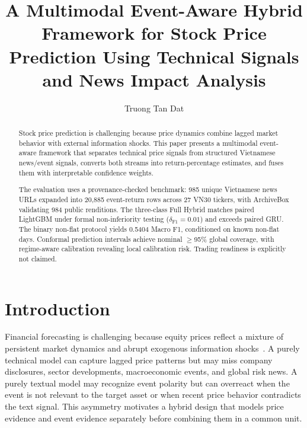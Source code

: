 \documentclass[runningheads]{llncs}
\title{A Multimodal Event-Aware Hybrid Framework for Stock Price Prediction Using Technical Signals and News Impact Analysis}
\author{Truong Tan Dat}
\institute{University of Information Technology, Vietnam National University Ho Chi Minh City\\ \email{datttruong.uit@gmail.com}}
\begin{document}
\maketitle

\begin{abstract}
Stock price prediction is challenging because price dynamics combine lagged market behavior with external information shocks. This paper presents a multimodal event-aware framework that separates technical price signals from structured Vietnamese news/event signals, converts both streams into return-percentage estimates, and fuses them with interpretable confidence weights.

The evaluation uses a provenance-checked benchmark: 985 unique Vietnamese news URLs expanded into 20,885 event-return rows across 27 VN30 tickers, with ArchiveBox validating 984 public renditions. The three-class Full Hybrid matches paired LightGBM under formal non-inferiority testing ($\delta_{\text{F1}}=0.01$) and exceeds paired GRU. The binary non-flat protocol yields 0.5404 Macro F1, conditioned on known non-flat days. Conformal prediction intervals achieve nominal $\ge$95\% global coverage, with regime-aware calibration revealing local calibration risk. Trading readiness is explicitly not claimed.
\end{abstract}

\section{Introduction}
\label{secintroduction}

Financial forecasting is challenging because equity prices reflect a mixture of persistent market dynamics and abrupt exogenous information shocks~\cite{fama1970efficient}. A purely technical model can capture lagged price patterns but may miss company disclosures, sector developments, macroeconomic events, and global risk news. A purely textual model may recognize event polarity but can overreact when the event is not relevant to the target asset or when recent price behavior contradicts the text signal. This asymmetry motivates a hybrid design that models price evidence and event evidence separately before combining them in a common unit.
\end{document}
